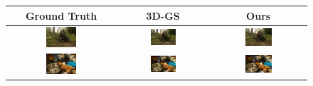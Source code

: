 
\begin{figure}[h]
    \centering
    \begin{tabular}{ccc}
        \textbf{Ground Truth} & \textbf{3D-GS} & \textbf{Ours} \\ \hline
            \includegraphics[width=0.3\textwidth]{../o-3dgs/eval/stump/test/ours_30000/gt/00000.png} &
            \includegraphics[width=0.3\textwidth]{../o-3dgs/eval/stump/test/ours_30000/renders/00000.png} & 
            \includegraphics[width=0.3\textwidth]{../o-3dgs/eval/stump/test/ours_30000/renders/00000.png} \\
            \includegraphics[width=0.3\textwidth]{../o-3dgs/eval/counter/test/ours_30000/gt/00000.png} &
            \includegraphics[width=0.3\textwidth]{../o-3dgs/eval/counter/test/ours_30000/renders/00000.png} & 
            \includegraphics[width=0.3\textwidth]{../o-3dgs/eval/counter/test/ours_30000/renders/00000.png} \\

\end{tabular}
\end{figure}
